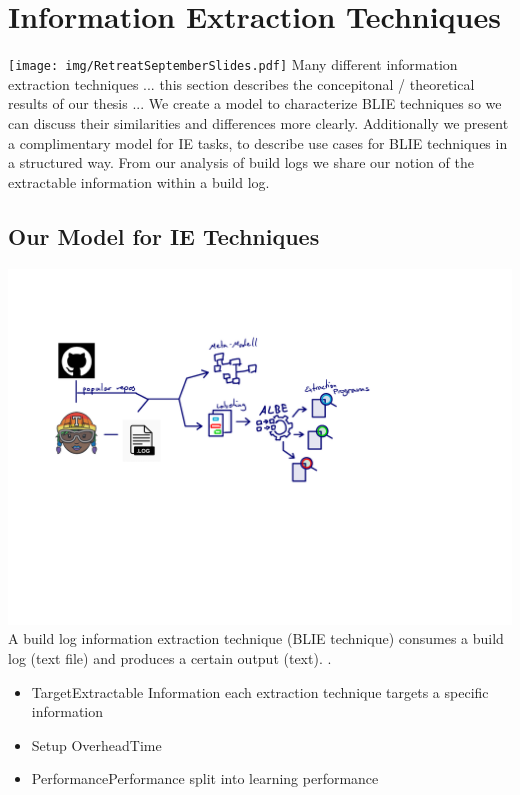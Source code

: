 \documentclass[\myrootdir/main.tex]{subfiles}
\begin{document}
\chapter{Information Extraction Techniques}
\label{models}
\texttt{[image: img/RetreatSeptemberSlides.pdf]}
Many different information extraction techniques ... this section describes the concepitonal / theoretical results of our thesis ... 
We create a model to characterize BLIE techniques so we can discuss their similarities and differences more clearly. 
Additionally we present a complimentary model for IE tasks, to describe use cases for BLIE techniques in a structured way.
From our analysis of build logs we share our notion of the extractable information within a build log.

\section{Our Model for IE Techniques}
\includegraphics[page=3, width=\textwidth, trim={0.5cm 0.5cm 0.5cm 0.5cm}, clip]{img/flow-of-research.pdf}
A build log information extraction technique (BLIE technique) consumes a build log (text file) and produces a certain output (text). .
\begin{itemize}
  \item{Target}{Extractable Information} each extraction technique  targets a specific information
  \item{Setup Overhead}{Time}
  \item{Performance}{Performance} split into learning performance
\end{itemize}
\end{document}
